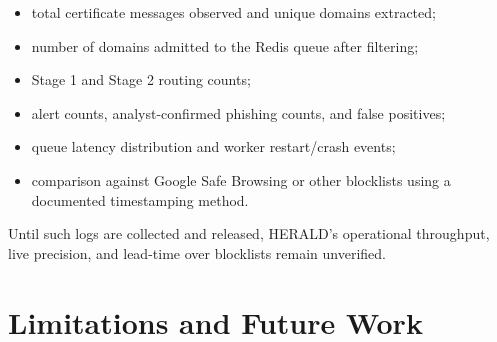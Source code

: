 \documentclass[conference]{IEEEtran}
\begin{document}
\begin{itemize}
    \item total certificate messages observed and unique domains extracted;
    \item number of domains admitted to the Redis queue after filtering;
    \item Stage 1 and Stage 2 routing counts;
    \item alert counts, analyst-confirmed phishing counts, and false positives;
    \item queue latency distribution and worker restart/crash events;
    \item comparison against Google Safe Browsing or other blocklists using a documented timestamping method.
\end{itemize}

Until such logs are collected and released, HERALD's operational throughput, live precision, and lead-time over blocklists remain unverified.

\section{Limitations and Future Work}
\end{document}
